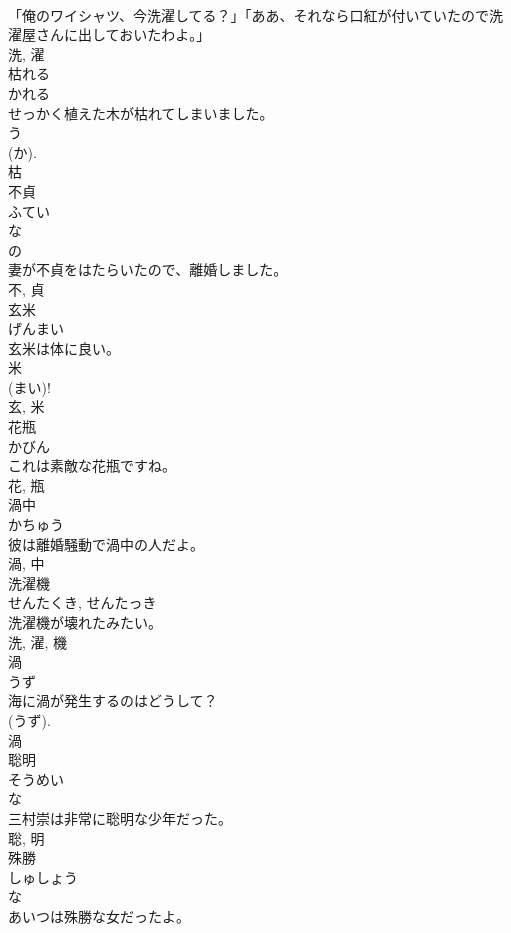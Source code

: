 \documentclass[8pt]{extreport}
\begin{document}
\begin{CJK}{UTF8}{min}
\\	「俺のワイシャツ、今洗濯してる？」「ああ、それなら口紅が付いていたので洗濯屋さんに出しておいたわよ。」	
\\	洗, 濯	
\\	枯れる	
\\	かれる	
\\	せっかく植えた木が枯れてしまいました。	
\\	う 
\\	(か). 
\\	枯	
\\	不貞	
\\	ふてい	
\\	な 
\\	の 
\\	妻が不貞をはたらいたので、離婚しました。	
\\	不, 貞	
\\	玄米	
\\	げんまい	
\\	玄米は体に良い。	
\\	米 
\\	(まい)! 
\\	玄, 米	
\\	花瓶	
\\	かびん	
\\	これは素敵な花瓶ですね。	
\\	花, 瓶	
\\	渦中	
\\	かちゅう	
\\	彼は離婚騒動で渦中の人だよ。	
\\	渦, 中	
\\	洗濯機	
\\	せんたくき, せんたっき	
\\	洗濯機が壊れたみたい。	
\\	洗, 濯, 機	
\\	渦	
\\	うず	
\\	海に渦が発生するのはどうして？	
\\	(うず). 
\\	渦	
\\	聡明	
\\	そうめい	
\\	な 
\\	三村崇は非常に聡明な少年だった。	
\\	聡, 明	
\\	殊勝	
\\	しゅしょう	
\\	な 
\\	あいつは殊勝な女だったよ。	

\end{CJK}
\end{document}
